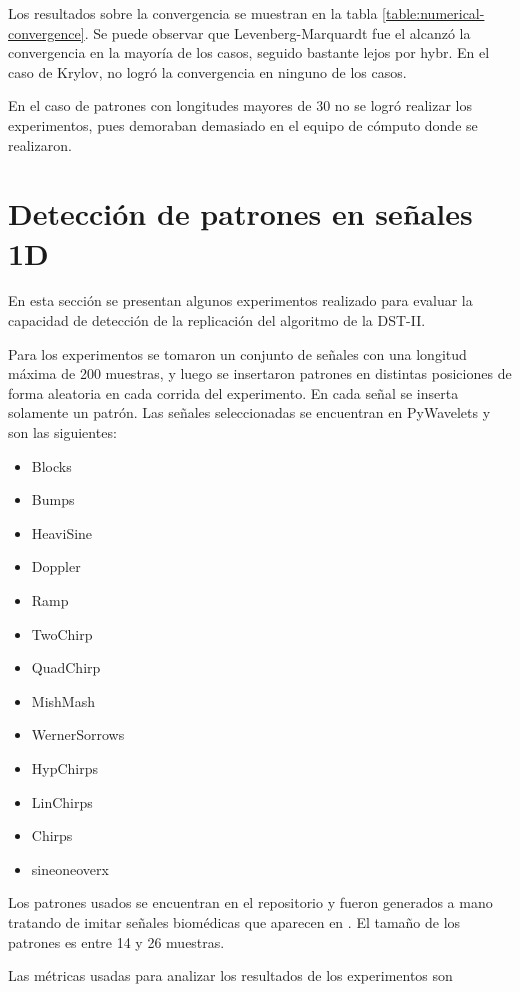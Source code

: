 Los resultados sobre la convergencia se muestran en la tabla \ref{table:numerical-convergence}. Se puede
observar que Levenberg-Marquardt fue el alcanzó la convergencia en la mayoría de los casos, seguido bastante
lejos por hybr. En el caso de Krylov, no logró la convergencia en ninguno de los casos.

En el caso de patrones con longitudes mayores de 30 no se logró realizar los experimentos, pues demoraban demasiado
en el equipo de cómputo donde se realizaron.

\section{Detección de patrones en señales 1D}

En esta sección se presentan algunos experimentos realizado para evaluar la capacidad  de detección de la replicación
del algoritmo de la DST-II.

Para los experimentos se tomaron un conjunto de señales con una longitud máxima de 200 muestras, y luego
se insertaron patrones en distintas posiciones de forma aleatoria en cada corrida del experimento. En cada señal 
se inserta solamente un patrón. Las señales seleccionadas se encuentran en PyWavelets
y son las siguientes:

\begin{itemize}
	\item  Blocks
	\item  Bumps
	\item  HeaviSine
	\item  Doppler
	\item  Ramp
	\item  TwoChirp
	\item  QuadChirp
	\item  MishMash
	\item  WernerSorrows
	\item  HypChirps
	\item  LinChirps
	\item  Chirps
	\item  sineoneoverx
\end{itemize}

Los patrones usados se encuentran en el repositorio y fueron generados a mano tratando de imitar señales biomédicas que
aparecen en \cite{Guido2018}. El tamaño de los patrones es entre 14 y 26 muestras.

Las métricas usadas para analizar los resultados de los experimentos son


